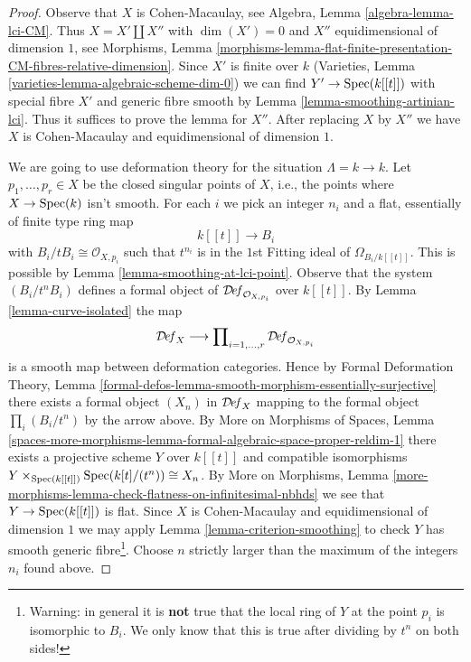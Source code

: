\begin{proof}
Observe that $X$ is Cohen-Macaulay, see
Algebra, Lemma \ref{algebra-lemma-lci-CM}.
Thus $X = X' \amalg X''$ with $\dim(X') = 0$
and $X''$ equidimensional of dimension $1$, see Morphisms, Lemma
\ref{morphisms-lemma-flat-finite-presentation-CM-fibres-relative-dimension}.
Since $X'$ is finite over $k$ (Varieties, Lemma
\ref{varieties-lemma-algebraic-scheme-dim-0})
we can find $Y' \to \mathop{\mathrm{Spec}}(k[[t]])$ with special
fibre $X'$ and generic fibre smooth by
Lemma \ref{lemma-smoothing-artinian-lci}.
Thus it suffices to prove the lemma for $X''$.
After replacing $X$ by $X''$ we have $X$ is
Cohen-Macaulay and equidimensional of dimension $1$.

\medskip\noindent
We are going to use deformation theory for the situation $\Lambda = k \to k$.
Let $p_1, \ldots, p_r \in X$ be the closed singular points of $X$, i.e.,
the points where $X \to \mathop{\mathrm{Spec}}(k)$ isn't smooth. For each $i$ we pick
an integer $n_i$ and a flat, essentially of finite type ring map
$$
k[[t]] \longrightarrow B_i
$$
with $B_i/tB_i \cong \mathcal{O}_{X, p_i}$ such that
$t^{n_i}$ is in the $1$st Fitting ideal of $\Omega_{B_i/k[[t]]}$.
This is possible by Lemma \ref{lemma-smoothing-at-lci-point}.
Observe that the system $(B_i/t^nB_i)$ defines a formal object of
$\mathcal{D}\!\mathit{ef}_{\mathcal{O}_{X, p_i}}$ over $k[[t]]$.
By Lemma \ref{lemma-curve-isolated} the map
$$
\mathcal{D}\!\mathit{ef}_X
\longrightarrow
\prod\nolimits_{i = 1, \ldots, r} \mathcal{D}\!\mathit{ef}_{\mathcal{O}_{X, p_i}}
$$
is a smooth map between deformation categories. Hence by
Formal Deformation Theory, Lemma
\ref{formal-defos-lemma-smooth-morphism-essentially-surjective}
there exists a formal object $(X_n)$ in $\mathcal{D}\!\mathit{ef}_X$
mapping to the formal object $\prod_i (B_i/t^n)$ by the arrow above.
By More on Morphisms of Spaces, Lemma
\ref{spaces-more-morphisms-lemma-formal-algebraic-space-proper-reldim-1}
there exists a projective scheme $Y$ over $k[[t]]$ and compatible
isomorphisms $Y \times_{\mathop{\mathrm{Spec}}(k[[t]])} \mathop{\mathrm{Spec}}(k[t]/(t^n)) \cong X_n$.
By More on Morphisms, Lemma
\ref{more-morphisms-lemma-check-flatness-on-infinitesimal-nbhds}
we see that $Y \to \mathop{\mathrm{Spec}}(k[[t]])$ is flat.
Since $X$ is Cohen-Macaulay and equidimensional of dimension $1$
we may apply Lemma \ref{lemma-criterion-smoothing}
to check $Y$ has smooth generic fibre\footnote{Warning: in general it is
{\bf not} true that the local ring of $Y$ at the point
$p_i$ is isomorphic to $B_i$. We only know that this is true after
dividing by $t^n$ on both sides!}.
Choose $n$ strictly larger than the maximum of the integers $n_i$ found above.

\end{proof}
